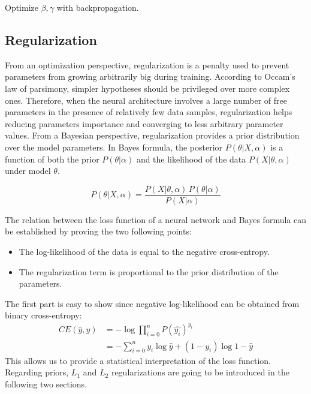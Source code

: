         Optimize $\beta, \gamma$ with backpropagation. \todo{}

    \subsection{Regularization}

    	From an optimization perspective, regularization is a penalty used to prevent
    	parameters from growing arbitrarily big during training.
    	According to Occam's law of parsimony, simpler hypotheses should be privileged over more complex ones.
    	Therefore, when the neural architecture involves a large number of free parameters
    	in the presence of relatively few data samples,
    	regularization helps reducing parameters importance and converging to less arbitrary parameter values.
    	From a Bayesian perspective, regularization provides a prior distribution over the model parameters.
    	In Bayes formula, the posterior $P(\theta \vert X, \alpha)$ is a function of both the prior
    	$P(\theta \vert \alpha)$ and the likelihood of the data $P(X \vert \theta, \alpha)$ under model $\theta$.

    	\begin{equation}
    	    P(\theta \vert X, \alpha) = \frac{P(X \vert \theta, \alpha)\,P(\theta \vert \alpha)}{P(X \vert \alpha)}
    	\end{equation}

    	The relation between the loss function of a neural network and Bayes formula can be established
    	by proving the two following points:

    	\begin{itemize}
    	    \item The log-likelihood of the data is equal to the negative cross-entropy.
    	    \item The regularization term is proportional to the prior distribution of the parameters.
    	\end{itemize}

    	The first part is easy to show since negative log-likelihood can be obtained from binary cross-entropy:
    	\begin{align}
    		CE(\hat{y}, y) & = - \log{\prod\limits_{i=0}^n P(\hat{y_i})^{y_i}}  \\
    		& = -\sum\limits_{i=0}^n y_i \log{\hat{y}} + (1 - y_i) \log{1 - \hat{y}}
    	\end{align}
    	This allows us to provide a statistical interpretation of the loss function.
    	Regarding priors, $L_1$ and $L_2$ regularizations are going to be introduced in the following two sections.

